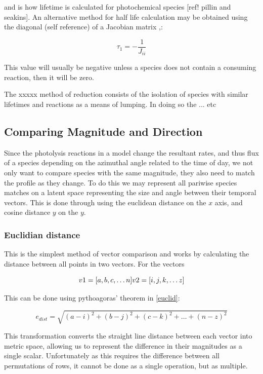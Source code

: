 \documentclass{pasa}%
\begin{document}
and is how lifetime is calculated for photochemical species [ref! pillin and seakins]. An alternative method for half life calculation may be obtained using the diagonal (self reference) of a Jacobian matrix ,\cite{kinetics}:

\begin{equation}
\tau_1 = - \frac{1}{J_{ii}}
\end{equation} 

This value will usually be negative unless a species does not contain a consuming reaction, then it will be zero. 


The xxxxx method of reduction consists of the isolation of species with similar lifetimes and reactions as a means of lumping. In doing so the ... etc 


\subsection{Comparing Magnitude and Direction}
Since the photolysis reactions in a model change the resultant rates, and thus flux of a species depending on the azimuthal angle related to the time of day, we not only want to compare species with the same magnitude, they also need to match the profile as they change. To do this we may represent all pariwise species matches on a latent space representing the size and angle between their temporal vectors. This is done through using the euclidean distance on the $x$ axis, and cosine distance $y$ on the $y$. 

\subsubsection{Euclidian distance}
This is the simplest method of vector comparison and works by calculating the distance between all points in two vectors. For the vectors

\begin{equation}
v1 = [ a,b,c, \dots n ] 
$$$$
v2 = [ i,j,k, \dots z ]
\end{equation}

This can be done using pythoagoras' theorem in \autoref{euclid}:

\begin{equation}
e_{dist}  = \sqrt{(a-i)^2 + (b-j)^2 + (c-k)^2 + \dots + (n-z)^2}
\label{euclid}
\end{equation}

This transformation converts the straight line distance between each vector into metric space, allowing us to represent the difference in their magnitudes as a single scalar. Unfortunately as this requires the difference between all permutations of rows, it cannot be done as a single operation, but as multiple. \\
\end{document}
